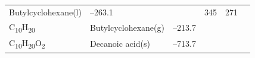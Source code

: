 \documentclass[
  9pt,
]{extbook}
\theoremstyle{definition}
\theoremstyle{definition}
\theoremstyle{definition}
\theoremstyle{remark}
\begin{document}
\begin{longtable}[]{@{}llllll@{}}
\begin{minipage}[t]{0.17\columnwidth}
Butylcyclohexane(l)\strut
\end{minipage} & \begin{minipage}[t]{0.15\columnwidth}\raggedright
--263.1\strut
\end{minipage} & \begin{minipage}[t]{0.15\columnwidth}\raggedright
\strut
\end{minipage} & \begin{minipage}[t]{0.14\columnwidth}\raggedright
345\strut
\end{minipage} & \begin{minipage}[t]{0.14\columnwidth}\raggedright
271\strut
\end{minipage}\tabularnewline
\begin{minipage}[t]{0.07\columnwidth}\raggedright
C\textsubscript{10}H\textsubscript{20}\strut
\end{minipage} & \begin{minipage}[t]{0.17\columnwidth}\raggedright
Butylcyclohexane(g)\strut
\end{minipage} & \begin{minipage}[t]{0.15\columnwidth}\raggedright
--213.7\strut
\end{minipage} & \begin{minipage}[t]{0.15\columnwidth}\raggedright
\strut
\end{minipage} & \begin{minipage}[t]{0.14\columnwidth}\raggedright
\strut
\end{minipage} & \begin{minipage}[t]{0.14\columnwidth}\raggedright
\strut
\end{minipage}\tabularnewline
\begin{minipage}[t]{0.07\columnwidth}\raggedright
C\textsubscript{10}H\textsubscript{20}O\textsubscript{2}\strut
\end{minipage} & \begin{minipage}[t]{0.17\columnwidth}\raggedright
Decanoic acid(s)\strut
\end{minipage} & \begin{minipage}[t]{0.15\columnwidth}\raggedright
--713.7\strut
\end{minipage} & \begin{minipage}[t]{0.15\columnwidth}\raggedright
\strut
\end{minipage} & \begin{minipage}[t]{0.14\columnwidth}\raggedright
\strut
\end{minipage} & \begin{minipage}[t]{0.14\columnwidth}\raggedright

\end{minipage}
\end{longtable}
\end{document}
